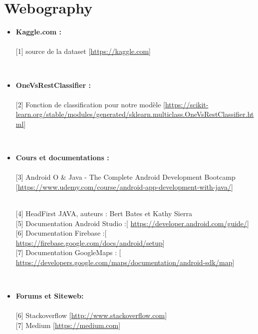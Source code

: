 \chapter*{Webography}

\vspace{2cm}

\begin{itemize}

\\\item \textbf{\Large{Kaggle.com : }}\\
\\{[1]} source de la dataset [\url{https://kaggle.com}] \vspace{0.3cm}

\\\item \textbf{\Large{OneVsRestClassifier : }}\\
\\{[2]} Fonction de classification pour notre modèle [\url{https://scikit-learn.org/stable/modules/generated/sklearn.multiclass.OneVsRestClassifier.html}] \vspace{0.3cm}

\\\item \textbf{\Large{Cours et documentations : }}\\
\\{[3]} Android O & Java - The Complete Android Development Bootcamp  [\url{https://www.udemy.com/course/android-app-development-with-java/}] \vspace{0.3cm}

\\{[4]} HeadFirst JAVA, auteurs : Bert Bates et Kathy Sierra 
\vspace{0.3cm}
\\{[5]} Documentation Android Studio :[ \url{https://developer.android.com/guide/}]
\vspace{0.3cm}
\\{[6]} Documentation Firebase :[ \url{https://firebase.google.com/docs/android/setup}]
\vspace{0.3cm}
\\{[7]} Documentation GoogleMaps : [ \url{https://developers.google.com/maps/documentation/android-sdk/map}]
\vspace{1cm}

\\ \item \textbf{\Large{Forums et Siteweb:}}\\
\\{[6]} Stackoverflow [\url{http://www.stackoverflow.com}]
\vspace{0.3cm}
\\{[7]} Medium [\url{https://medium.com}]


\end{itemize}
